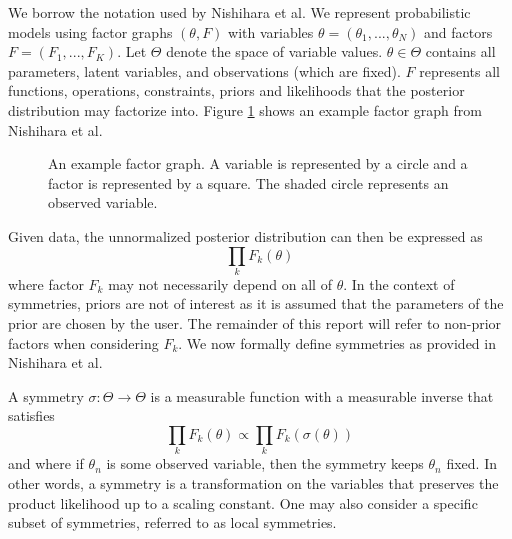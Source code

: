 We borrow the notation used by Nishihara et al. We represent probabilistic models using factor graphs $(\theta,F)$ with variables $\theta=(\theta_1,...,\theta_N)$ and factors $F=(F_1,...,F_K)$. Let $\Theta$ denote the space of variable values. $\theta\in\Theta$ contains all parameters, latent variables, and observations (which are fixed). $F$ represents all functions, operations, constraints, priors and likelihoods that the posterior distribution may factorize into. Figure \ref{fig:factorgraph} shows an example factor graph from Nishihara et al.

\begin{figure}[h]
\begin{center}
\end{center}
\caption{An example factor graph. A variable is represented by a circle and a factor is represented by a square. The shaded circle represents an observed variable.}
\label{fig:factorgraph}
\end{figure}

Given data, the unnormalized posterior distribution can then be expressed as
\[
\prod_kF_k(\theta)
\]
where factor $F_k$ may not necessarily depend on all of $\theta$. In the context of symmetries, priors are not of interest as it is assumed that the parameters of the prior are chosen by the user. The remainder of this report will refer to non-prior factors when considering $F_k$. We now formally define symmetries as provided in Nishihara et al.
\begin{defn}
A symmetry $\sigma:\Theta\rightarrow\Theta$ is a measurable function with a measurable inverse that satisfies
\[
\prod_kF_k(\theta) \propto \prod_kF_k(\sigma(\theta))
\]
and where if $\theta_n$ is some observed variable, then the symmetry keeps $\theta_n$ fixed. In other words, a symmetry is a transformation on the variables that preserves the product likelihood up to a scaling constant. One may also consider a specific subset of symmetries, referred to as local symmetries.
\end{defn}

